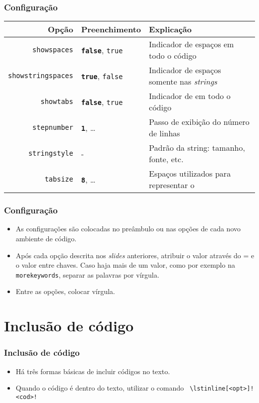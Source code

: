 \documentclass[brazilian]{beamer}
\begin{document}
\begin{frame}[fragile]
\end{frame}

\begin{frame}[fragile]
    \frametitle{Configuração}
\tiny
    \begin{table}
        \begin{tabular}{rC{2cm}O{6cm}}
            Opção & Preenchimento & Explicação \\ \hline
            \texttt{showspaces} & \texttt{\bfseries false}, \texttt{true} & Indicador de espaços em todo o código \\ \hline
            \texttt{showstringspaces} & \texttt{\bfseries true}, \texttt{false} & Indicador de espaços somente nas \textit{strings} \\ \hline
            \texttt{showtabs} & \texttt{\bfseries false}, \texttt{true} & Indicador de \keys{\tab} em todo o código \\ \hline
            \texttt{stepnumber} & \texttt{\bfseries 1}, \ldots & Passo de exibição do número de linhas \\ \hline
            \texttt{stringstyle} & - & Padrão da string: tamanho, fonte, etc. \\ \hline
            \texttt{tabsize} & \texttt{\bfseries 8}, \ldots & Espaços utilizados para representar o \keys{\tab} \\ \hline
        \end{tabular}
    \end{table}
\end{frame}

\begin{frame}
    \frametitle{Configuração}

    \begin{itemize}
        \item As configurações são colocadas no preâmbulo ou nas opções de cada novo ambiente de código.
        \item Após cada opção descrita nos \textit{slides} anteriores, atribuir o valor através do = e o valor entre chaves. Caso haja mais de um valor, como por exemplo na \texttt{morekeywords}, separar as palavras por vírgula.
        \item Entre as opções, colocar vírgula.
    \end{itemize}

\end{frame}

\section{Inclusão de código}
\begin{frame}[fragile]
    \frametitle{Inclusão de código}

    \begin{itemize}
        \item Há três formas básicas de incluir códigos no texto. 
        \item Quando o código é dentro do texto, utilizar o comando \lstinline[style=myStyleLatex]! \lstinline[<opt>]!\texttt{!<cod>!}
    \end{itemize}

\end{frame}
\end{document}
